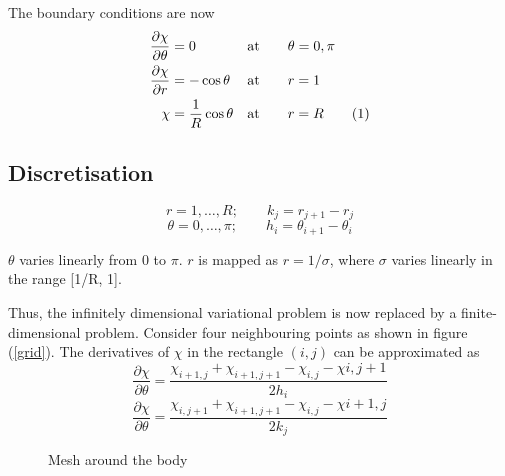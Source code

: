 \documentclass[a4paper]{report}
\newcommand\numberthis{\addtocounter{equation}{1}\tag{\theequation}}
\begin{document}
	The boundary conditions are now
	\begin{align*}
	\frac{\partial\chi}{\partial\theta}&=0 &\text{at} \qquad  &\theta=0,\pi \\
	\frac{\partial\chi}{\partial r}&=-\cos \theta &\text{at} \qquad  &r=1 \\	
	\chi &=\frac{1}{R}\cos \theta &\text{at} \qquad  &r=R \numberthis \label{bcs}
	\end{align*}

	\subsection{Discretisation}
	
	$$r = 1,\ldots,R; \qquad  k_j = r_{j+1} - r_j $$
	$$\theta = 0,\ldots,\pi; \qquad h_i = \theta_{i+1} - \theta_i  $$	
	
	$\theta$ varies linearly from $0$ to $\pi$. $r$ is mapped as $r=1/\sigma$, where $\sigma$ varies linearly in the range [1/R, 1]. 	
	
	Thus, the infinitely dimensional variational problem is now replaced by a finite-dimensional problem. Consider four neighbouring points as shown in figure (\ref{grid}). The derivatives of $\chi$ in the rectangle $(i,j)$ can be approximated as
	$$
	\frac{\partial \chi}{\partial \theta} = 
	\frac{\chi_{i+1,j}+\chi_{i+1,j+1}-\chi_{i,j}-\chi{i,j+1}}{2h_i}
	$$
	$$
	\frac{\partial \chi}{\partial \theta} = 
	\frac{\chi_{i,j+1}+\chi_{i+1,j+1}-\chi_{i,j}-\chi{i+1,j}}{2k_j}
	$$
	
	
	
	
	
	\begin{figure}
		\centering
  		\caption{Mesh around the body}
	\end{figure}		
	
\end{document}
